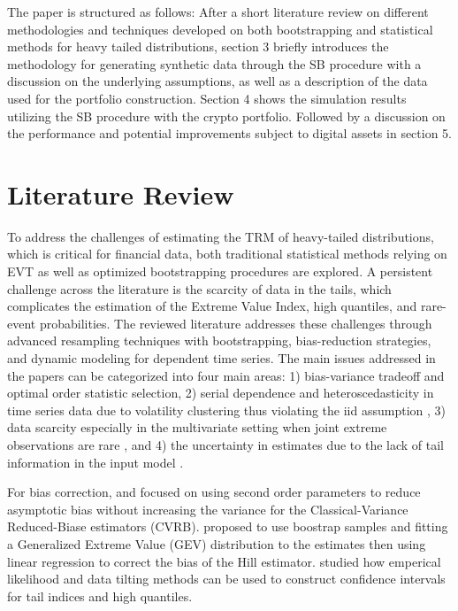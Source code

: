 \documentclass[a4paper,11pt]{article}
\begin{document}
The paper is structured as follows: 
After a short literature review on different methodologies and techniques developed on both bootstrapping and statistical methods for heavy tailed distributions,
section 3 briefly introduces the methodology for generating synthetic data through the SB procedure with a discussion on the underlying assumptions, as well as a description of the data used for the portfolio construction.
Section 4 shows the simulation results utilizing the SB procedure with the crypto portfolio. 
Followed by a discussion on the performance and potential improvements subject to digital assets in section 5.

\section{Literature Review}

To address the challenges of estimating the TRM of heavy-tailed distributions, which is critical for financial data, 
both traditional statistical methods relying on EVT as well as optimized bootstrapping procedures are explored.
A persistent challenge across the literature is the scarcity of data in the tails, which complicates the estimation of the Extreme Value Index, high quantiles, and rare-event probabilities.
The reviewed literature addresses these challenges through advanced resampling techniques with bootstrapping, bias-reduction strategies, and dynamic modeling for dependent time series.
The main issues addressed in the papers can be categorized into four main areas: 
1) bias-variance tradeoff and optimal order statistic selection\parencite{gomes2012adaptive,gomes2016bootstrap,qi2008bootstrap,nemeth2020regression}, 
2) serial dependence and heteroscedasticity in time series data due to volatility clustering thus violating the iid assumption \parencite{mcneil2000estimation,bee2018estimating,davis2018inference},
3) data scarcity especially in the multivariate setting when joint extreme observations are rare \parencite{madhar2025spectral}, 
and 4) the uncertainty in estimates due to the lack of tail information in the input model \parencite{huang2023propagation}.

For bias correction, \textcite{gomes2012adaptive} and \textcite{gomes2016bootstrap} focused on using second order parameters to reduce asymptotic bias without increasing the variance for the Classical-Variance Reduced-Biase estimators (CVRB).
\textcite{nemeth2020regression} proposed to use boostrap samples and fitting a Generalized Extreme Value (GEV) distribution to the estimates then using linear regression to correct the bias of the Hill estimator.
\textcite{qi2008bootstrap} studied how emperical likelihood and data tilting methods can be used to construct confidence intervals for tail indices and high quantiles.
\end{document}
